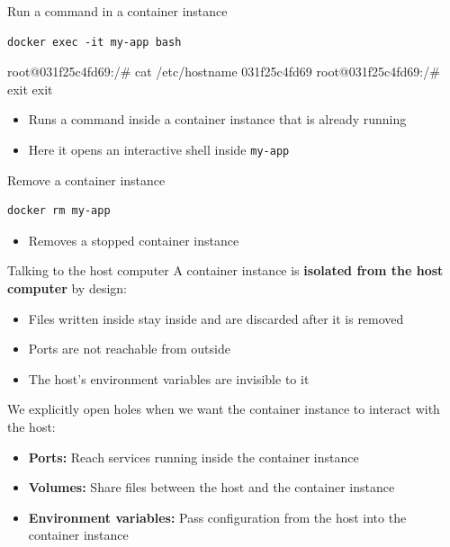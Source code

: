\documentclass[aspectratio=169]{beamer}
\begin{document}
\begin{frame}[fragile]{Run a command in a container instance}
  \begin{verbatim}
docker exec -it my-app bash
  \end{verbatim}
  \begin{cmdoutput}
root@031f25c4fd69:/# cat /etc/hostname
031f25c4fd69
root@031f25c4fd69:/# exit
exit
  \end{cmdoutput}

  \begin{itemize}
    \item Runs a command inside a container instance that is already running
    \item Here it opens an interactive shell inside \texttt{my-app}
  \end{itemize}

\note{
}
\end{frame}


\begin{frame}[fragile]{Remove a container instance}
  \begin{verbatim}
docker rm my-app
  \end{verbatim}

  \begin{itemize}
    \item Removes a stopped container instance
  \end{itemize}

\note{
}
\end{frame}


\begin{frame}{Talking to the host computer}
  A container instance is \textbf{isolated from the host computer} by design:
  \begin{itemize}
    \item Files written inside stay inside and are discarded after it is removed
    \item Ports are not reachable from outside
    \item The host's environment variables are invisible to it
  \end{itemize}

  \vspace{1.0em}
  We explicitly open holes when we want the container instance to interact with the host:
  \begin{itemize}
    \item \textbf{Ports:} Reach services running inside the container instance
    \item \textbf{Volumes:} Share files between the host and the container instance
    \item \textbf{Environment variables:} Pass configuration from the host into the container instance
  \end{itemize}

\note{
}
\end{frame}
\end{document}
